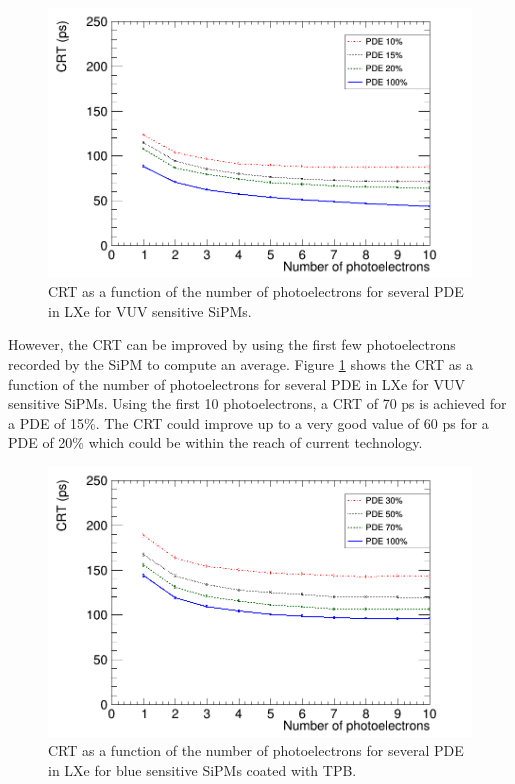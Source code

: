 \documentclass[review]{elsarticle}
\begin{document}
\begin{figure}[!bhtp]
	\centering
	\includegraphics[scale=0.4]{../img/lxe_noCher_avg_npe.png}
	\caption{\label{fig.crt4} CRT as a function of the number of photoelectrons for several PDE in LXe for VUV sensitive SiPMs.}
\end{figure}

However, the CRT can be improved by using the first few photoelectrons recorded by the SiPM to compute an average. 
Figure \ref{fig.crt4} shows the CRT as a function of the number of photoelectrons for several PDE in LXe for VUV sensitive SiPMs. Using the first 10 photoelectrons, a CRT of 70 ps is achieved for a PDE of 15\%. The CRT could improve up to a very good value of 60 ps for a PDE of 20\% which could be within the reach of current technology. 

\begin{figure}[!bhtp]
	\centering
	\includegraphics[scale=0.4]{../img/lxe_tpb_noCher_avg_npe.png}
	\caption{\label{fig.crt5} CRT as a function of the number of photoelectrons for several PDE in LXe for blue sensitive SiPMs coated with TPB.}
\end{figure}
\end{document}

